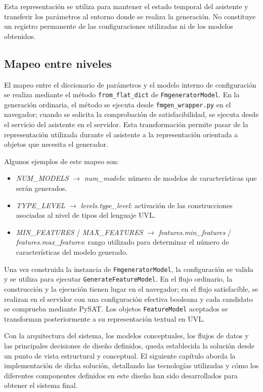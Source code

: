 Esta representación se utiliza para mantener el estado temporal del asistente
y transferir los parámetros al entorno donde se realiza la generación. No
constituye un registro permanente de las configuraciones utilizadas ni de los
modelos obtenidos.

\subsection{Mapeo entre niveles}
\label{subsec:mapeo}


El mapeo entre el diccionario de parámetros y el modelo interno de
configuración se realiza mediante el método \texttt{from\_flat\_dict} de
\texttt{FmgeneratorModel}. En la generación ordinaria, el método se ejecuta
desde \texttt{fmgen\_wrapper.py} en el navegador; cuando se solicita la
comprobación de satisfacibilidad, se ejecuta desde el servicio del asistente
en el servidor. Esta transformación permite pasar de la representación
utilizada durante el asistente a la representación orientada a objetos que
necesita el generador.

Algunos ejemplos de este mapeo son:

\begin{itemize}
    \item \textit{NUM\_MODELS} $\rightarrow$ \textit{num\_models}: número de
    modelos de características que serán generados.

    \item \textit{TYPE\_LEVEL} $\rightarrow$ \textit{levels.type\_level}: activación de las construcciones asociadas al nivel de tipos del lenguaje UVL.

    \item \textit{MIN\_FEATURES} / \textit{MAX\_FEATURES} $\rightarrow$
    \textit{features.min\_features} / \textit{features.max\_features}: rango
    utilizado para determinar el número de características del modelo generado.
\end{itemize}

Una vez construida la instancia de \texttt{FmgeneratorModel}, la configuración
se valida y se utiliza para ejecutar \texttt{GenerateFeatureModel}. En el
flujo ordinario, la construcción y la ejecución tienen lugar en el navegador;
en el flujo satisfacible, se realizan en el servidor con una configuración
efectiva booleana y cada candidato se comprueba mediante PySAT. Los objetos
\texttt{FeatureModel} aceptados se transforman posteriormente a su
representación textual en UVL.


Con la arquitectura del sistema, los modelos conceptuales, los flujos de datos
y las principales decisiones de diseño definidos, queda establecida la solución
desde un punto de vista estructural y conceptual. El siguiente capítulo aborda
la implementación de dicha solución, detallando las tecnologías utilizadas y
cómo los diferentes componentes definidos en este diseño han sido desarrollados
para obtener el sistema final.